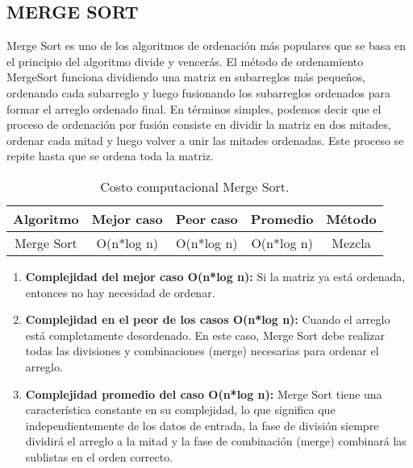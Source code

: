 \documentclass{article}
\begin{document}
\subsection{MERGE SORT}
Merge Sort es uno de los algoritmos de ordenación más populares que se basa en el principio del algoritmo divide y vencerás. El método de ordenamiento MergeSort funciona dividiendo una matriz en subarreglos más pequeños, ordenando cada subarreglo y luego fusionando los subarreglos ordenados para formar el arreglo ordenado final. En términos simples, podemos decir que el proceso de ordenación por fusión consiste en dividir la matriz en dos mitades, ordenar cada mitad y luego volver a unir las mitades ordenadas. Este proceso se repite hasta que se ordena toda la matriz.

    \begin{table}[H]
        \centering
        \begin{tabular}{||c c c c c||} 
         \hline
         \textbf{Algoritmo} & \textbf{Mejor caso} & \textbf{Peor caso} & \textbf{Promedio} & \textbf{Método} \\ [0.5ex] 
         \hline\hline
         Merge Sort & O(n*log n) & O(n*log n) & O(n*log n) & Mezcla \\ [0.5ex] 
         \hline
        \end{tabular}
        \caption{Costo computacional Merge Sort.}
        \label{table:dataMergeSort}
    \end{table}
    
    \begin{enumerate}
            \item \textbf{Complejidad del mejor caso O(n*log n):} Si la matriz ya está ordenada, entonces no hay necesidad de ordenar.
            
            \item \textbf{Complejidad en el peor de los casos O(n*log n):} Cuando el arreglo está completamente desordenado. En este caso, Merge Sort debe realizar todas las divisiones y combinaciones (merge) necesarias para ordenar el arreglo.
            
            \item \textbf{Complejidad promedio del caso O(n*log n):} Merge Sort tiene una característica constante en su complejidad, lo que significa que independientemente de los datos de entrada, la fase de división siempre dividirá el arreglo a la mitad y la fase de combinación (merge) combinará las sublistas en el orden correcto.
    \end{enumerate}
\end{document}

